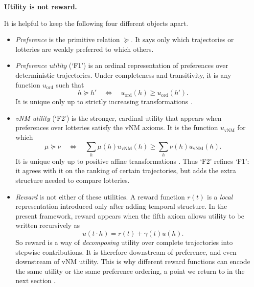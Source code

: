\documentclass[11pt]{article}
\newcommand{\pref}{\succcurlyeq}
\begin{document}
\begin{callout}
\textbf{Utility is not reward.}

It is helpful to keep the following four different objects apart.

\begin{itemize}

\item \emph{Preference} is the primitive relation $\pref$. It says only which
trajectories or lotteries are weakly preferred to which others.

\item \emph{Preference utility} (`F1') is an ordinal representation of preferences
over deterministic trajectories. Under completeness and transitivity, it is any
function $u_{\mathrm{ord}}$ such that
\[
h\pref h'
\quad\Longleftrightarrow\quad
u_{\mathrm{ord}}(h)\geq u_{\mathrm{ord}}(h').
\]
It is unique only up to strictly increasing transformations
\citep{fishburn1970utility}.

\item \emph{vNM utility} (`F2') is the stronger, cardinal utility that appears when
preferences over lotteries satisfy the vNM axioms. It is the function
$u_{\mathrm{vNM}}$ for which
\[
\mu\pref\nu
\quad\Longleftrightarrow\quad
\sum_h \mu(h)u_{\mathrm{vNM}}(h)\geq \sum_h \nu(h)u_{\mathrm{vNM}}(h).
\]
It is unique only up to positive affine transformations
\citep{vonneumann1944theory}. Thus `F2' refines `F1': it agrees with it on the
ranking of certain trajectories, but adds the extra structure needed to compare
lotteries.

\item \emph{Reward} is not either of these utilities. A reward function $r(t)$ is a
\emph{local} representation introduced only after adding temporal structure. In
the present framework, reward appears when the fifth axiom allows utility to be
written recursively as
\[
u(t\cdot h)=r(t)+\gamma(t)u(h).
\]
So reward is a way of \emph{decomposing} utility over complete trajectories into
stepwise contributions. It is therefore downstream of preference, and even
downstream of vNM utility. This is why different reward functions can encode the
same utility or the same preference ordering, a point we return to in the next
section \citep{bowling2023settling}.
\end{itemize}

\end{callout}
\end{document}
